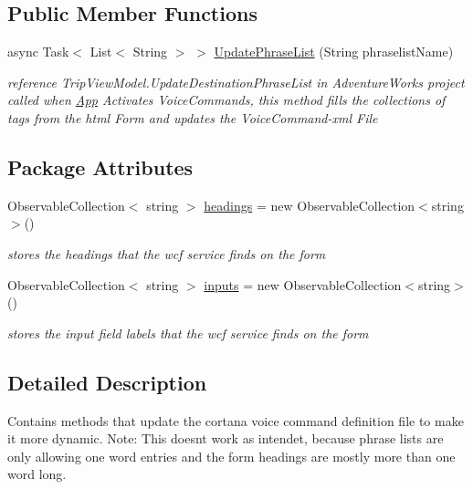 \subsection*{Public Member Functions}
\begin{DoxyCompactItemize}
\item 
async Task$<$ List$<$ String $>$ $>$ \hyperlink{class_listen_to_me_1_1_cortana_model_methods_afe872337c3f1c74f5db6e26918f29ac1}{Update\+Phrase\+List} (String phraselist\+Name)
\begin{DoxyCompactList}\small\item\em reference Trip\+View\+Model.\+Update\+Destination\+Phrase\+List in Adventure\+Works project called when \hyperlink{class_listen_to_me_1_1_app}{App} Activates Voice\+Commands, this method fills the collections of tags from the html Form and updates the Voice\+Command-\/xml File \end{DoxyCompactList}\end{DoxyCompactItemize}
\subsection*{Package Attributes}
\begin{DoxyCompactItemize}
\item 
Observable\+Collection$<$ string $>$ \hyperlink{class_listen_to_me_1_1_cortana_model_methods_a163bfa4e5d0d538593edc2802a3d9b42}{headings} = new Observable\+Collection$<$string$>$()
\begin{DoxyCompactList}\small\item\em stores the headings that the wcf service finds on the form \end{DoxyCompactList}\item 
Observable\+Collection$<$ string $>$ \hyperlink{class_listen_to_me_1_1_cortana_model_methods_ab5c02fb296556b31d87eab09fea7c514}{inputs} = new Observable\+Collection$<$string$>$()
\begin{DoxyCompactList}\small\item\em stores the input field labels that the wcf service finds on the form \end{DoxyCompactList}\end{DoxyCompactItemize}


\subsection{Detailed Description}
Contains methods that update the cortana voice command definition file to make it more dynamic. Note\+: This doesn\textquotesingle{}t work as intendet, because phrase lists are only allowing one word entries and the form headings are mostly more than one word long. 



